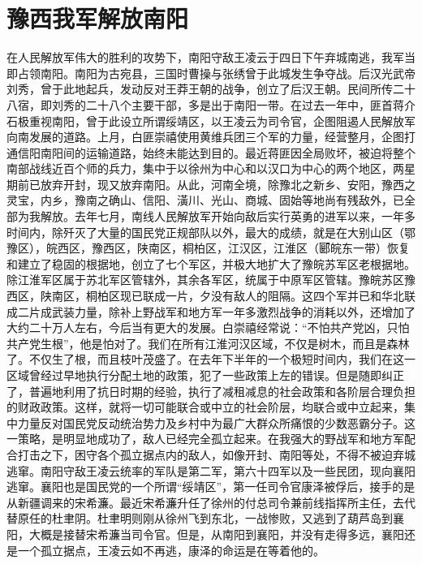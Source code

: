 \section[豫西我军解放南阳（一九四八年十一月七日）]{豫西我军解放南阳}


在人民解放军伟大的胜利的攻势下，南阳守敌王凌云于四日下午弃城南逃，我军当即占领南阳。南阳为古宛县，三国时曹操与张绣曾于此城发生争夺战。后汉光武帝刘秀，曾于此地起兵，发动反对王莽王朝的战争，创立了后汉王朝。民间所传二十八宿，即刘秀的二十八个主要干部，多是出于南阳一带。在过去一年中，匪首蒋介石极重视南阳，曾于此设立所谓绥靖区，以王凌云为司令官，企图阻遏人民解放军向南发展的道路。上月，白匪崇禧使用黄维兵团三个军的力量，经营整月，企图打通信阳南阳间的运输道路，始终未能达到目的。最近蒋匪因全局败坏，被迫将整个南部战线近百个师的兵力，集中于以徐州为中心和以汉口为中心的两个地区，两星期前已放弃开封，现又放弃南阳。从此，河南全境，除豫北之新乡、安阳，豫西之灵宝，内乡，豫南之确山、信阳、潢川、光山、商城、固始等地尚有残敌外，已全部为我解放。去年七月，南线人民解放军开始向敌后实行英勇的进军以来，一年多时间内，除歼灭了大量的国民党正规部队以外，最大的成绩，就是在大别山区（鄂豫区），皖西区，豫西区，陕南区，桐柏区，江汉区，江淮区（郾皖东一带）恢复和建立了稳固的根据地，创立了七个军区，并极大地扩大了豫皖苏军区老根据地。除江淮军区属于苏北军区管辖外，其余各军区，统属于中原军区管辖。豫皖苏区豫西区，陕南区，桐柏区现已联成一片，夕没有敌人的阻隔。这四个军并已和华北联成二片成武装力量，除补上野战军和地方军一年多激烈战争的消耗以外，还增加了大约二十万人左右，今后当有更大的发展。白崇禧经常说：“不怕共产党凶，只怕共产党生根”，他是怕对了。我们在所有江淮河汉区域，不仅是树木，而且是森林了。不仅生了根，而且枝叶茂盛了。在去年下半年的一个极短时间内，我们在这一区域曾经过早地执行分配土地的政策，犯了一些政策上左的错误。但是随即纠正了，普遍地利用了抗日时期的经验，执行了减租减息的社会政策和各阶层合理负担的财政政策。这样，就将一切可能联合或中立的社会阶层，均联合或中立起来，集中力量反对国民党反动统治势力及乡村中为最广大群众所痛恨的少数恶霸分子。这一策略，是明显地成功了，敌人已经完全孤立起来。在我强大的野战军和地方军配合打击之下，困守各个孤立据点内的敌人，如像开封、南阳等处，不得不被迫弃城逃窜。南阳守敌王凌云统率的军队是第二军，第六十四军以及一些民团，现向襄阳逃窜。襄阳也是国民党的一个所谓“绥靖区”，第一任司令官康泽被俘后，接手的是从新疆调来的宋希濂。最近宋希濂升任了徐州的付总司令兼前线指挥所主任，去代替原任的杜聿阴。杜聿明则刚从徐州飞到东北，一战惨败，又逃到了葫芦岛到襄阳，大概是接替宋希濂当司令官。但是，从南阳到襄阳，并没有走得多远，襄阳还是一个孤立据点，王凌云如不再逃，康泽的命运是在等着他的。

